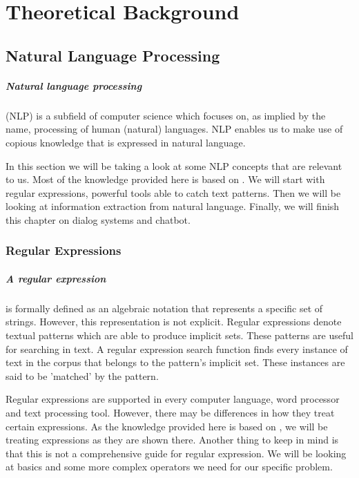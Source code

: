 
\chapter{Theoretical Background}\label{chapter:theoretical_background}

\section{Natural Language Processing}
\paragraph{Natural language processing }(NLP) is a subfield of computer science which focuses on, as implied by the name, processing of human (natural) languages. NLP enables us to make use of copious knowledge that is expressed in natural language. \parencite{ai_nlp} 


In this section we will be taking a look at some NLP concepts that are relevant to us. 
Most of the knowledge provided here is based on \parencite{nlp}.
We will start with regular expressions, powerful tools able to catch text patterns. 
Then we will be looking at information extraction from natural language. 
Finally, we will finish this chapter on dialog systems and chatbot.

\subsection{Regular Expressions}
\paragraph{A regular expression}is formally defined as an algebraic notation that represents a specific set of strings.
However, this representation is not explicit. 
Regular expressions denote textual patterns which are able to produce implicit sets.
These patterns are useful for searching in text.
A regular expression search function finds every instance of text in the corpus that belongs to the pattern's implicit set.
These instances are said to be 'matched' by the pattern.

Regular expressions are supported in every computer language, word processor and text processing tool. 
However, there may be differences in how they treat certain expressions. 
As the knowledge provided here is based on \parencite{nlp_re}, we will be treating expressions as they are shown there.
Another thing to keep in mind is that this is not a comprehensive guide for regular expression. 
We will be looking at basics and some more complex operators we need for our specific problem. 

